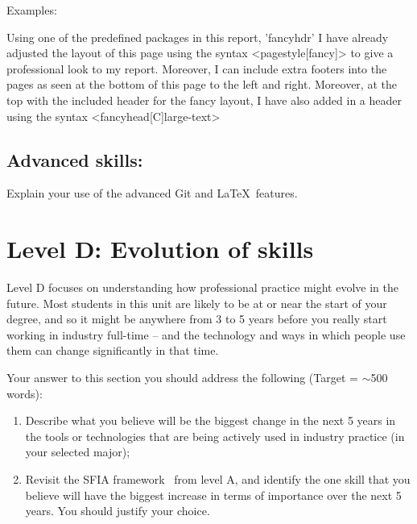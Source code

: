 \documentclass[a4paper, 11pt]{report}
\begin{document}
Examples:

Using one of the predefined packages in this report, 'fancyhdr' I have already adjusted the layout of this page using the syntax <pagestyle[fancy]> to give a professional look to my report.  Moreover, I can include extra footers into the pages as seen at the bottom of this page to the left and right.  Moreover, at the top with the included header for the fancy layout, I have also added in a header using the syntax <fancyhead[C]large-text>




\newpage

\lfoot{}
\rfoot{}

\pagestyle{fancy}

\subsection{Advanced skills: \studD}

Explain your use of the advanced Git and \LaTeX\ features. 




\newpage

\section{Level D: Evolution of skills}

Level D focuses on understanding how professional practice might evolve in the future. Most students in this unit are likely to be at or near the start of your degree, and so it might be anywhere from 3 to 5 years before you really start working in industry full-time -- and the technology and ways in which people use them can change significantly in that time. 

Your answer to this section you should address the following (Target = $\sim$500 words):
\begin{enumerate}
	\item Describe what you believe will be the biggest change in the next 5 years in the tools or technologies that are being actively used in industry practice (in your selected major);
	\item Revisit the SFIA framework~\cite{sfia} from level A, and identify the one skill that you believe will have the biggest increase in terms of importance over the next 5 years. You should justify your choice.
\end{enumerate}
\end{document}
